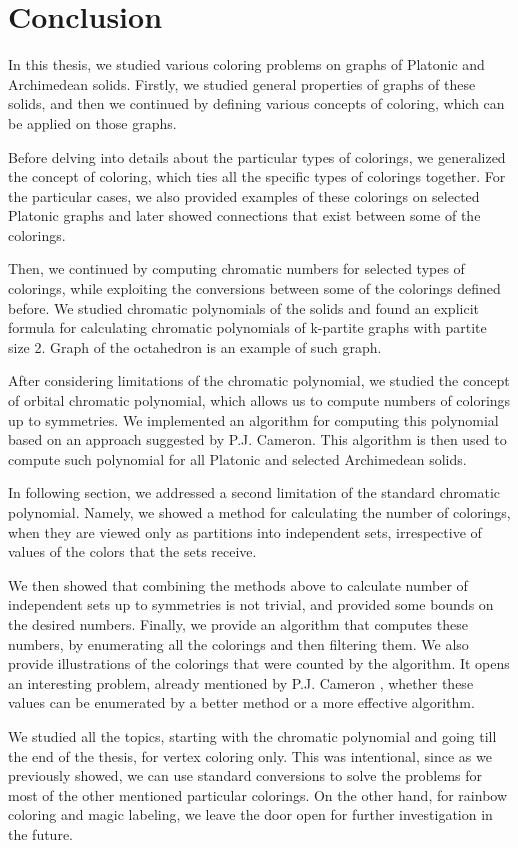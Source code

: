 \chapter*{Conclusion}

In this thesis, we studied various coloring problems on graphs of Platonic and Archimedean solids. Firstly, we studied general properties of graphs of these solids, and then we continued by defining various concepts of coloring, which can be applied on those graphs.

Before delving into details about the particular types of colorings, we generalized the concept of coloring, which ties all the specific types of colorings together. For the particular cases, we also provided examples of these colorings on selected Platonic graphs and later showed connections that exist between some of the colorings.

Then, we continued by computing chromatic numbers for selected types of colorings, while exploiting the conversions between some of the colorings defined before. We studied chromatic polynomials of the solids and found an explicit formula for calculating chromatic polynomials of k-partite graphs with partite size 2. Graph of the octahedron is an example of such graph.

After considering limitations of the chromatic polynomial, we studied the concept of orbital chromatic polynomial, which allows us to compute numbers of colorings up to symmetries. We implemented an algorithm for computing this polynomial based on an approach suggested by P.J. Cameron. This algorithm is then used to compute such polynomial for all Platonic and selected Archimedean solids.

In following section, we addressed a second limitation of the standard chromatic polynomial. Namely, we showed a method for calculating the number of colorings, when they are viewed only as partitions into independent sets, irrespective of values of the colors that the sets receive.

\begin{highlight}
We then showed that combining the methods above to calculate number of independent sets up to symmetries is not trivial, and provided some bounds on the desired numbers. Finally, we provide an algorithm that computes these numbers, by enumerating all the colorings and then filtering them. We also provide illustrations of the colorings that were counted by the algorithm. It opens an interesting problem, already mentioned by P.J. Cameron \cite{cameron-countcols}, whether these values can be enumerated by a better method or a more effective algorithm.
\end{highlight}

We studied all the topics, starting with the chromatic polynomial and going till the end of the thesis, for vertex coloring only. This was intentional, since as we previously showed, we can use standard conversions to solve the problems for most of the other mentioned particular colorings. On the other hand, for rainbow coloring and magic labeling, we leave the door open for further investigation in the future.
